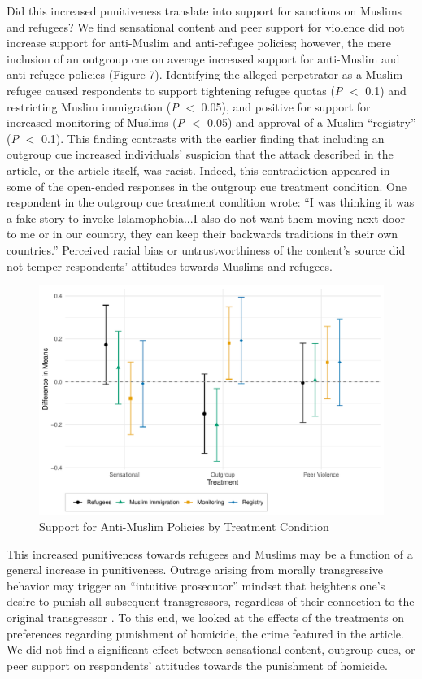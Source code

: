 Did this increased punitiveness translate into support for sanctions on Muslims and refugees? We find sensational content and peer support for violence did not increase support for anti-Muslim and anti-refugee policies; however, the mere inclusion of an outgroup cue on average increased support for anti-Muslim and anti-refugee policies (Figure 7). Identifying the alleged perpetrator as a Muslim refugee caused respondents to support tightening refugee quotas (\textit{P} $<$ 0.1) and restricting Muslim immigration  (\textit{P} $<$ 0.05), and positive for support for increased monitoring of Muslims  (\textit{P} $<$ 0.05) and approval of a Muslim ``registry'' (\textit{P} $<$ 0.1). This finding contrasts with the earlier finding that including an outgroup cue increased individuals' suspicion that the attack described in the article, or the article itself, was racist. Indeed, this contradiction appeared in some of the open-ended responses in the outgroup cue treatment condition. One respondent in the outgroup cue treatment condition wrote: ``I was thinking it was a fake story to invoke Islamophobia...I also do not want them moving next door to me or in our country, they can keep their backwards traditions in their own countries.'' Perceived racial bias or untrustworthiness of the content's source did not temper respondents' attitudes towards Muslims and refugees.

\begin{figure}[!htbp]
  \centering
  \caption{Support for Anti-Muslim Policies by Treatment Condition}
  \includegraphics[width=.835\textwidth]{figures/ATE_punitive.pdf}
\end{figure}

This increased punitiveness towards refugees and Muslims may be a function of a general increase in punitiveness. Outrage arising from morally transgressive behavior may trigger an ``intuitive prosecutor'' mindset that heightens one's desire to punish all subsequent transgressors, regardless of their connection to the original transgressor \citep{crockett2017moral, goldberg1999rage, tetlock2007}. To this end, we looked at the effects of the treatments on preferences regarding punishment of homicide, the crime featured in the article. We did not find a significant effect between sensational content, outgroup cues, or peer support on respondents' attitudes towards the punishment of homicide. 

